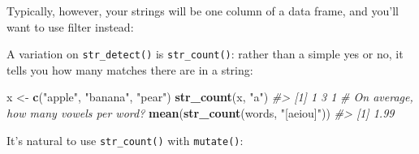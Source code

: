 \documentclass[]{book}
\newenvironment{Shaded}{\begin{snugshade}}{\end{snugshade}}
\newcommand{\CommentTok}[1]{\textcolor[rgb]{0.56,0.35,0.01}{\textit{#1}}}
\newcommand{\DataTypeTok}[1]{\textcolor[rgb]{0.13,0.29,0.53}{#1}}
\newcommand{\KeywordTok}[1]{\textcolor[rgb]{0.13,0.29,0.53}{\textbf{#1}}}
\newcommand{\NormalTok}[1]{#1}
\newcommand{\OperatorTok}[1]{\textcolor[rgb]{0.81,0.36,0.00}{\textbf{#1}}}
\newcommand{\StringTok}[1]{\textcolor[rgb]{0.31,0.60,0.02}{#1}}
\begin{document}
Typically, however, your strings will be one column of a data frame, and you'll want to use filter instead:

\begin{Shaded}
\end{Shaded}

A variation on \texttt{str\_detect()} is \texttt{str\_count()}: rather than a simple yes or no, it tells you how many matches there are in a string:

\begin{Shaded}
\begin{Highlighting}[]
\NormalTok{x <-}\StringTok{ }\KeywordTok{c}\NormalTok{(}\StringTok{"apple"}\NormalTok{, }\StringTok{"banana"}\NormalTok{, }\StringTok{"pear"}\NormalTok{)}
\KeywordTok{str_count}\NormalTok{(x, }\StringTok{"a"}\NormalTok{)}
\CommentTok{#> [1] 1 3 1}
\CommentTok{# On average, how many vowels per word?}
\KeywordTok{mean}\NormalTok{(}\KeywordTok{str_count}\NormalTok{(words, }\StringTok{"[aeiou]"}\NormalTok{))}
\CommentTok{#> [1] 1.99}
\end{Highlighting}
\end{Shaded}

It's natural to use \texttt{str\_count()} with \texttt{mutate()}:

\begin{Shaded}
\end{Shaded}
\end{document}
